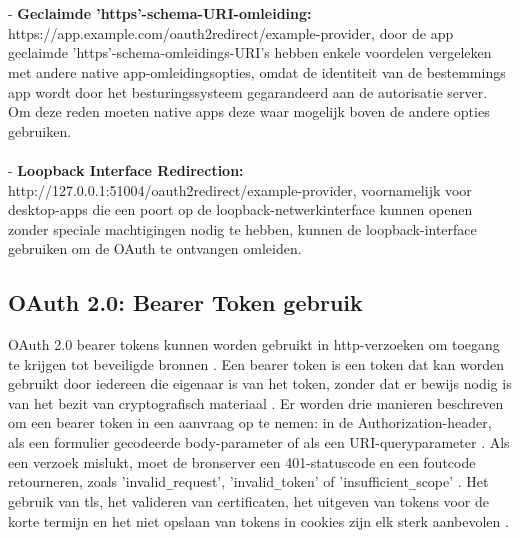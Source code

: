   \\\\
  - \textbf{Geclaimde 'https'-schema-URI-omleiding:} https://app.example.com/oauth2redirect/example-provider, door de app geclaimde 'https'-schema-omleidings-URI's hebben enkele voordelen vergeleken met andere native app-omleidingsopties, omdat de identiteit van de bestemmings app wordt door het besturingssysteem gegarandeerd aan de autorisatie server. Om deze reden moeten native apps deze waar mogelijk boven de andere opties gebruiken.
  \\\\
  - \textbf{Loopback Interface Redirection:} http://127.0.0.1:51004/oauth2redirect/example-provider, voornamelijk voor desktop-apps die een poort op de loopback-netwerkinterface kunnen openen zonder speciale machtigingen nodig te hebben, kunnen de loopback-interface gebruiken om de OAuth te ontvangen omleiden.

  
  \subsection{OAuth 2.0: Bearer Token gebruik}%
  \label{subsec:oauth-2.0-bearer-token-gebruik}
  OAuth 2.0 bearer tokens kunnen worden gebruikt in \gls{http}-verzoeken om toegang te krijgen tot beveiligde bronnen \autocite[p.~{Section 1.0}]{Jones2012}.
  Een bearer token is een token dat kan worden gebruikt door iedereen die eigenaar is van het token, zonder dat er bewijs nodig is van het bezit van cryptografisch materiaal \autocite[p.~{Section 1.2}]{Jones2012}.
  Er worden drie manieren beschreven om een bearer token in een aanvraag op te nemen: in de Authorization-header, als een formulier gecodeerde body-parameter of als een URI-queryparameter \autocite[p.~{Section 2.1}]{Jones2012}. Als een verzoek mislukt, moet de bronserver een 401-statuscode en een foutcode retourneren, zoals 'invalid\verb|_|request', 'invalid\verb|_|token' of 'insufficient\verb|_|scope' \autocite[p.~{Section 3.0}]{Jones2012}.
  Het gebruik van \gls{tls}, het valideren van certificaten, het uitgeven van tokens voor de korte termijn en het niet opslaan van tokens in cookies zijn elk sterk aanbevolen \autocite[p.~{Section 5.0}]{Jones2012}.


